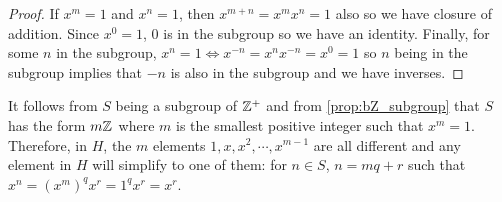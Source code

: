\documentclass[MathsNotesBase.tex]{subfiles}
\begin{document}
{		
		\begin{proof}
			If $x^m = 1$ and $x^n = 1$, then $x^{m+n} = x^mx^n = 1$ also so we have closure of addition. Since $x^0 = 1$, 0 is in the subgroup so we have an identity. Finally, for some $n$ in the subgroup, $x^n = 1 \iff x^{-n} = x^nx^{-n} = x^0 = 1$ so $n$ being in the subgroup implies that $-n$ is also in the subgroup and we have inverses.
		\end{proof}
		\begin{corollary}
			It follows from $S$ being a subgroup of $\mathbb{Z}^{+}$ and from \autoref{prop:bZ_subgroup} that $S$ has the form $m\mathbb{Z}^{}$ where $m$ is the smallest positive integer such that $x^m = 1$. Therefore, in $H$, the $m$ elements $1, x, x^2, \cdots , x^{m-1}$ are all different and any element in $H$ will simplify to one of them: for $n \in S$, $n = mq + r$ such that $x^n = (x^m)^qx^r = 1^qx^r = x^r$.
		\end{corollary}
		
	
}
\end{document}
